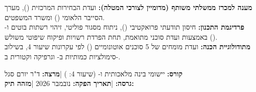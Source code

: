 \begin{titlepage}
\begin{tcolorbox}[
  enhanced,
  colback=csNavyBg,
  colframe=csNavy,
  arc=5pt,
  boxrule=1pt,
  left=16pt, right=16pt, top=14pt, bottom=14pt
]
  \textbf{מענה למכרז ממשלתי משותף (מדומיין לצורכי המטלה):} ועדת הבחירות המרכזית (), מערך הסייבר הלאומי () ומשרד המשפטים.\\[8pt]
  \textbf{פרדיגמת התכנון:} חיסון תודעתי פרואקטיבי (), ניתוח מסגור פוליטי, זיהוי רשתות בוטים ו- באמצעות ועדת סוכני  מתואמת, תחת הפרדת רשויות ופיקוח שיפוטי משולש ().\\[8pt]
  \textbf{מתודולוגיית הכנה:} ועדת מומחים של 5 סוכנים אוטונומיים () לפי עקרונות שיעור 4, בשילוב סימולציות כמותיות ב- וגרפיקה וקטורית ב-.
\end{tcolorbox}

\vfill

\begin{center}
  \color{white}\small
  \textbf{קורס:} יישומי בינה מלאכותית ו- (שיעור 4: ) \quad|\quad \textbf{מרצה:} ד"ר יורם סגל\\[4pt]
  \textbf{גרסה:}  \quad|\quad \textbf{תאריך הפקה:} נובמבר 2026 \quad|\quad \textbf{מזהה תיק:} 
\end{center}
\vspace*{-0.6cm}

\end{titlepage}
